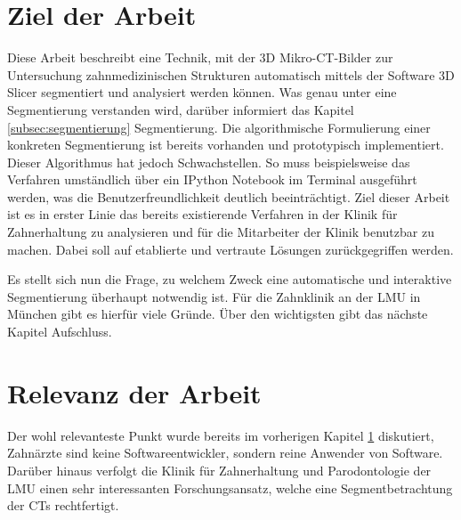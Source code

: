\section{Ziel der Arbeit}
\label{sec:ziel_der_arbeit} Diese Arbeit beschreibt eine Technik, mit der \ac{3D}
Mikro-\ac{CT}-Bilder zur Untersuchung zahnmedizinischen Strukturen automatisch
mittels der Software 3D Slicer segmentiert und analysiert werden können. Was genau
unter eine Segmentierung verstanden wird, darüber informiert das Kapitel
\ref{subsec:segmentierung} Segmentierung. Die algorithmische Formulierung einer konkreten
Segmentierung ist bereits vorhanden und prototypisch implementiert. Dieser
Algorithmus hat jedoch Schwachstellen. So muss beispielsweise das Verfahren umständlich
über ein IPython Notebook im Terminal ausgeführt werden, was die
Benutzerfreundlichkeit deutlich beeinträchtigt. Ziel dieser Arbeit ist es in erster
Linie das bereits existierende Verfahren in der Klinik für Zahnerhaltung zu analysieren
und für die Mitarbeiter der Klinik benutzbar zu machen. Dabei soll auf
etablierte und vertraute Lösungen zurückgegriffen werden.

Es stellt sich nun die Frage, zu welchem Zweck eine automatische und interaktive
Segmentierung überhaupt notwendig ist. Für die Zahnklinik an der LMU in München
gibt es hierfür viele Gründe. Über den wichtigsten gibt das nächste Kapitel Aufschluss.

\section{Relevanz der Arbeit}
\label{sec:relevanz_der_arbeit} Der wohl relevanteste Punkt wurde bereits im vorherigen
Kapitel \ref{sec:ziel_der_arbeit} diskutiert, Zahnärzte sind keine
Softwareentwickler, sondern reine Anwender von Software. Darüber hinaus verfolgt
die Klinik für Zahnerhaltung und Parodontologie der \ac{LMU} einen sehr interessanten
Forschungsansatz, welche eine Segmentbetrachtung der \ac{CT}s rechtfertigt.

